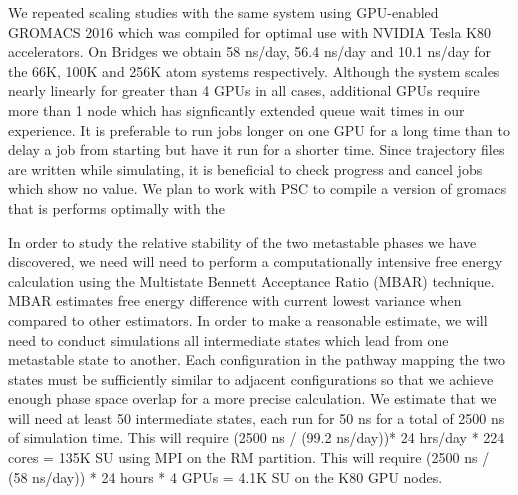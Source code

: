 We repeated scaling studies with the same system using GPU-enabled 
GROMACS 2016 which was compiled for optimal use with NVIDIA Tesla K80
accelerators. On Bridges we obtain 58 ns/day, 56.4 ns/day and 10.1 ns/day
for the 66K, 100K and 256K atom systems respectively. Although the system
scales nearly linearly for greater than 4 GPUs in all cases, additional
GPUs require more than 1 node which has signficantly extended queue wait
times in our experience. It is preferable to run jobs longer on one GPU
for a long time than to delay a job from starting but have it run for a
shorter time. Since trajectory files are written while simulating, it
is beneficial to check progress and cancel jobs which show no value.
We plan to work with PSC to compile a version of gromacs that is performs
optimally with the
 

In order to study the relative stability of the two metastable phases 
we have discovered, we need will need to perform a computationally 
intensive free energy calculation using the Multistate Bennett
Acceptance Ratio (MBAR) technique. MBAR estimates free energy 
difference with current lowest variance when compared to other estimators.
In order to make a reasonable estimate, we will need to conduct 
simulations all intermediate states which lead from one metastable
state to another. Each configuration in the pathway mapping the two
states must be sufficiently similar to adjacent configurations so that
we achieve enough phase space overlap for a more precise calculation. 
We estimate that we will need at least 50 intermediate states, each run
for 50 ns for a total of 2500 ns of simulation time. This will require 
(2500 ns / (99.2 ns/day))* 24 hrs/day * 224 cores = 135K SU using
MPI on the RM partition. This will require (2500 ns / (58 ns/day)) * 24
hours * 4 GPUs = 4.1K SU on the K80 GPU nodes.

